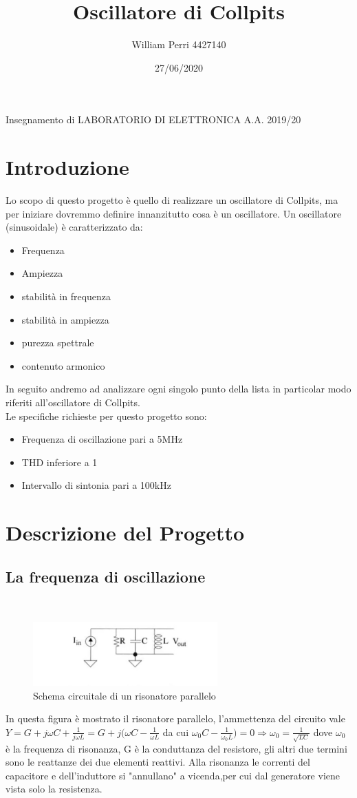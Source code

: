 \documentclass{article}
\title{Oscillatore di Collpits}
\author{William Perri 4427140 }
\date{27/06/2020}
\begin{document}
\maketitle
Insegnamento di LABORATORIO DI ELETTRONICA A.A. 2019/20

\newpage
\tableofcontents
\newpage
\section{Introduzione}
Lo scopo di questo progetto è quello di realizzare un oscillatore di Collpits, ma per iniziare dovremmo definire innanzitutto cosa è un oscillatore.
Un oscillatore (sinusoidale) è caratterizzato da:
\begin{itemize}
\item Frequenza
\item Ampiezza
\item stabilità in frequenza
\item stabilità in ampiezza
\item purezza spettrale
\item contenuto armonico
\end{itemize}
In seguito andremo ad analizzare ogni singolo punto della lista in particolar modo riferiti all'oscillatore di Collpits.\\
Le specifiche richieste per questo progetto sono:
\begin{itemize}
\item Frequenza di oscillazione pari a 5MHz
\item THD inferiore a 1%
\item Intervallo di sintonia pari a 100kHz
\end{itemize}
\newpage
\section{Descrizione del Progetto}
\subsection{La frequenza di oscillazione}
~\begin{figure}[H]
\includegraphics[scale=2]{RisonatoreParallelo.png} 
\centering
\caption{Schema circuitale di un risonatore parallelo}
\label{fig:foo}
\end{figure}
In questa figura è mostrato il risonatore parallelo, l'ammettenza del circuito vale 
$Y=G+j\omega C+\frac{1}{j\omega L}=G+j(\omega C-\frac{1}{\omega L}$ da cui $\omega_0C-\frac{1}{\omega _0L})=0 \Rightarrow \omega _0=\frac{1}{\sqrt{LC}}$ dove $\omega _0$ è la frequenza di risonanza, G è la conduttanza del resistore, gli altri due termini sono le reattanze dei due elementi reattivi.
Alla risonanza le correnti del capacitore e dell'induttore si "annullano" a vicenda,per cui dal generatore viene vista solo la resistenza. 
\end{document}
